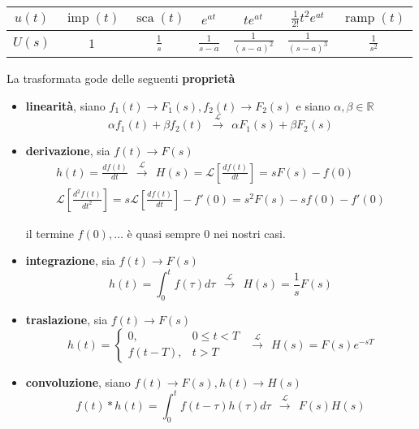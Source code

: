 \documentclass[10pt,a4paper]{book}
\DeclareMathOperator{\imp}{imp}
\DeclareMathOperator{\sca}{sca}
\DeclareMathOperator{\ramp}{ramp}
\begin{document}
\begin{center}
	
	\begin{tabular}{ccccccc}
		\toprule 
		$u(t)$ & $\imp(t)$ & $\sca(t)$     & $e^{at}$        & $te^{at}$           & $\frac{1}{2!} t^2 e^{at}$ & $\ramp(t)$      \\
		\midrule 
		$U(s)$ & $1$       & $\frac{1}{s}$ & $\frac{1}{s-a}$ & $\frac{1}{(s-a)^2}$ & $\frac{1}{(s-a)^3}$       & $\frac{1}{s^2}$ \\
		\bottomrule
	\end{tabular}
\end{center}


La trasformata gode delle seguenti \textbf{proprietà}
\begin{itemize}
	\item \textbf{linearità}, siano $f_1(t)\rightarrow F_1(s) ,f_2(t)\rightarrow F_2(s)$ e siano $\alpha ,\beta \in \mathbb{R}$\begin{equation*}
	      \alpha f_1(t) +\beta f_2(t) \ \ \xrightarrow{\mathcal{L}} \ \ \alpha F_1(s) +\beta F_2(s)
	\end{equation*}
	\item \textbf{derivazione}, sia $f(t)\rightarrow F(s)$\begin{gather*}
	      h(t) =\frac{df(t)}{dt} \ \ \xrightarrow{\mathcal{L}} \ \ H(s) =\mathcal{L}\left[\frac{df(t)}{dt}\right] =sF(s) -f(0)\\
	      \mathcal{L}\left[\frac{d^2 f(t)}{dt^2}\right] =s\mathcal{L}\left[\frac{df(t)}{dt}\right] -f'(0) =s^2 F(s) -sf(0) -f'(0)
	\end{gather*}
	
	il termine $f(0) ,\dotsc $ è quasi sempre $0$ nei nostri casi.
	\item \textbf{integrazione}, sia $f(t)\rightarrow F(s)$\begin{equation*}
	      h(t) =\int ^t_0 f(\tau) d\tau \ \ \xrightarrow{\mathcal{L}} \ \ H(s) =\frac{1}{s} F(s)
	\end{equation*}
	\item \textbf{traslazione}, sia $f(t)\rightarrow F(s)$\begin{equation}
	      h(t) =\begin{cases}
	      0, & 0\leqslant t< T\\
	      f(t-T) , & t >T
	\end{cases} \ \ \xrightarrow{\mathcal{L}
		} \ \ H(s) =F(s) e^{-sT}
	\end{equation}
	\item \textbf{convoluzione}, siano $f(t)\rightarrow F(s) ,h(t)\rightarrow H(s)$\begin{equation*}
	      f(t) *h(t) =\int ^t_0 f(t-\tau) h(\tau) d\tau \ \ \xrightarrow{\mathcal{L}} \ \ F(s) H(s)
	\end{equation*}
\end{itemize}
\end{document}
